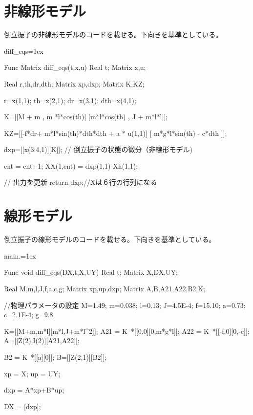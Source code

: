 \section{非線形モデル}
	倒立振子の非線形モデルのコードを載せる。下向きを基準としている。
	\begin{breakitembox}[l]{diff\_eqs}\baselineskip=1ex
		\begin{verbatimtab}[4]
Func Matrix diff_eqs(t,x,u)
Real t;
Matrix x,u;
{
	Real r,th,dr,dth;
	Matrix xp,dxp;
	Matrix K,KZ;

	r=x(1,1);
	th=x(2,1);
	dr=x(3,1);
	dth=x(4,1);

	K=[[M + m , m *l*cos(th)]
	   [m*l*cos(th) , J + m*l*l]];

	KZ=[[-f*dr+ m*l*sin(th)*dth*dth + a * u(1,1)]
		[ m*g*l*sin(th) - c*dth ]];
	
	dxp=[[x(3:4,1)][K\KZ]]; // 倒立振子の状態の微分（非線形モデル)

	cnt = cnt+1;
	XX(1,cnt) = dxp(1,1)-Xh(1,1);
	
	// 出力を更新
	return dxp;//Xは６行の行列になる
}
		\end{verbatimtab}
	\end{breakitembox}
\section{線形モデル}
	倒立振子の線形モデルのコードを載せる。下向きを基準としている。
	\begin{breakitembox}[l]{main.}\baselineskip=1ex
		\begin{verbatimtab}[4]
Func void diff_eqs(DX,t,X,UY)
Real t;
Matrix X,DX,UY;
{
	Real M,m,l,J,f,a,c,g;
	Matrix xp,up,dxp;
	Matrix A,B,A21,A22,B2,K;
	
	//物理パラメータの設定
	M=1.49;   m=0.038; l=0.13;
	J=4.5E-4; f=15.10; a=0.73;
	c=2.1E-4; g=9.8;
	
	K=[[M+m,m*l][m*l,J+m*l^2]];
	A21 = K~*[[0,0][0,m*g*l]];
	A22 = K~*[[-f,0][0,-c]];
	A=[[Z(2),I(2)][A21,A22]];
	
	B2 = K~*[[a][0]];
	B=[[Z(2,1)][B2]];
	
	xp = X;
	up = UY;
	
	dxp = A*xp+B*up;
	
	DX = [dxp];

}
		\end{verbatimtab}
	\end{breakitembox}
